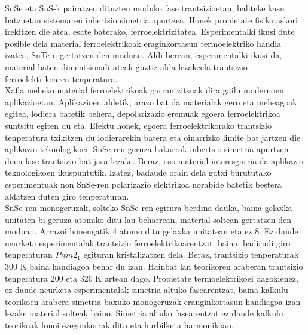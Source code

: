 SnSe eta SnS-k pairatzen dituzten moduko fase trantsizioetan, baliteke kasu batzuetan sistemaren inbertsio simetria 
apurtzea\cite{ribeiro2018strong,chang2016discovery}. Honek propietate fisiko askori irekitzen die atea, esate 
baterako, ferroelektrizitatea. Esperimentalki ikusi dute posible dela material ferroelektrikoak eraginkortasun 
termoelektriko handia izatea\cite{ribeiro2018strong,zhang2013high}, SnTe-n gertatzen den moduan. Aldi 
berean, esperimentalki ikusi da, material baten dimentsionalitateak guztiz alda lezakeela trantsizio 
ferroelektrikoaren tenperatura. \\

Xafla meheko material ferroelektrikoak garrantzitsuak dira gailu modernoen 
aplikazioetan\cite{lallart2011ferroelectrics}. Aplikazioen aldetik, arazo bat da materialak gero eta meheagoak 
egitea, lodiera batetik behera, depolarizazio eremuak egoera ferroelektrikoa 
suntsitu\cite{batra1973new,zhong1994giant,dawber2005physics} egiten du eta. Efektu honek, egoera ferroelektrikorako 
trantsizio tenperatura txikitzen du lodierarekin batera eta oinarrizko limite bat jartzen die aplikazio 
teknologikoei. SnSe-ren geruza bakarrak\cite{chang2020controlled} inbertsio simetria apurtzen duen fase trantsizio 
bat jasa lezake. Beraz, oso material interesgarria da aplikazio teknologikoen ikuspuntutik. Izatez, badaude orain 
dela gutxi burututako esperimentuak\cite{chang2020controlled} non SnSe-ren polarizazio elektrikoa norabide batetik 
bestera aldatzen duten giro tenperaturan. \\

SnSe-ren monogeruzak, solteko SnSe-ren egitura berdina dauka, baina gelaxka unitaten bi geruza atomiko ditu lau 
beharrean, material soltean gertatzen den moduan. Arrazoi honengatik 4 atomo ditu gelaxka unitatean eta ez 8. Ez 
daude neurketa esperimentalak trantsizio ferroelektrikoarentzat, baina, badirudi giro tenperaturan $Pnm2_{1}$ 
egituran kristalizatzen dela. Beraz, trantsizio tenperaturak 300 K baina handiagoa behar du izan. Hainbat lan 
teorikoren araberan\cite{mehboudi2016structural,barraza2018tuning} trantsizio tenperatura 200 eta 320 K artean dago. 
Propietate termoelektrikoei dagokienez, ez daude neurketa esperimentalak simetria altuko fasearentzat, baina kalkulu 
teorikoen arabera\cite{wang2015thermoelectric,hu2017high} simetria baxuko monogeruzak eranginkortasun handiagoa izan 
lezake material solteak baino. Simetria altuko fasearentzat ez daude kalkulu teorikoak fonoi ezegonkorrak ditu eta 
hurbilketa harmonikoan. \\

